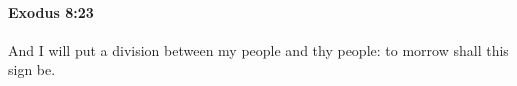 
		\paragraph{Exodus 8:23} %
			\label{EXODUS-8-23}

			And I will put a division between my people and thy people: to morrow shall this sign be.



